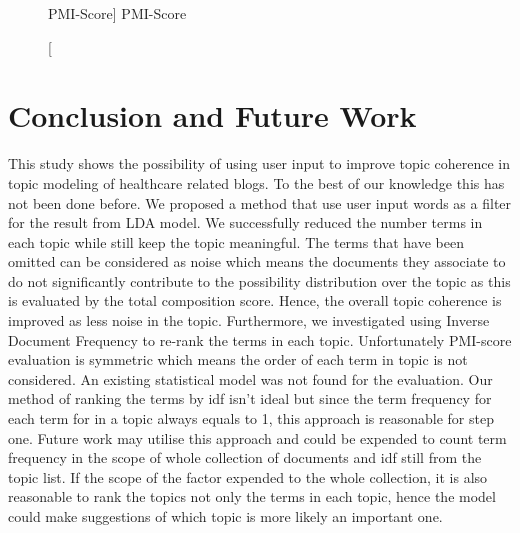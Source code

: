 \documentclass[11pt,twoside]{report}
\begin{document}
\begin{figure}[h]
    \begin{center}
    \caption
    [PMI-Score]
    {
    PMI-Score
    \label{Figure5}
    }
    \end{center}
\end{figure}

\chapter{Conclusion and Future Work}
This study shows the possibility of using user input to improve topic coherence in topic modeling of healthcare related blogs. To the best of our knowledge this has not been done before. We proposed a method that use user input words as a filter for the result from LDA model. We successfully reduced the number terms in each topic while still keep the topic meaningful. The terms that have been omitted can be considered as noise which means the documents they associate to do not significantly contribute to the possibility distribution over the topic as this is evaluated by the total composition score. Hence, the overall topic coherence is improved as less noise in the topic. Furthermore, we investigated using Inverse Document Frequency to re-rank the terms in each topic. Unfortunately PMI-score evaluation is symmetric which means the order of each term in topic is not considered. An existing statistical model was not found for the evaluation. 
Our method of ranking the terms by idf isn't ideal but since the term frequency for each term for in a topic always equals to 1, this approach is reasonable for step one. Future work may utilise this approach and could be expended to count term frequency in the scope of whole collection of documents and idf still from the topic list. If the scope of the factor expended to the whole collection, it is also reasonable to rank the topics not only the terms in each topic, hence the model could make suggestions of which topic is more likely an important one.



\end{document}
